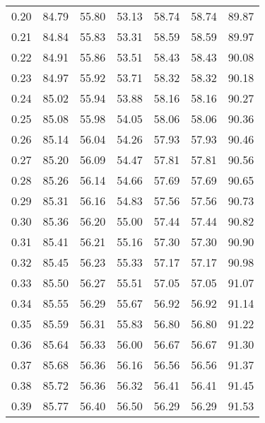 \begin{tabular}{|c|c|c|c|c|c|c|}
      0.20 &     84.79 &     55.80 &      53.13 &   58.74 &      58.74 &         89.87 \\
      0.21 &     84.84 &     55.83 &      53.31 &   58.59 &      58.59 &         89.97 \\
      0.22 &     84.91 &     55.86 &      53.51 &   58.43 &      58.43 &         90.08 \\
      0.23 &     84.97 &     55.92 &      53.71 &   58.32 &      58.32 &         90.18 \\
      0.24 &     85.02 &     55.94 &      53.88 &   58.16 &      58.16 &         90.27 \\
      0.25 &     85.08 &     55.98 &      54.05 &   58.06 &      58.06 &         90.36 \\
      0.26 &     85.14 &     56.04 &      54.26 &   57.93 &      57.93 &         90.46 \\
      0.27 &     85.20 &     56.09 &      54.47 &   57.81 &      57.81 &         90.56 \\
      0.28 &     85.26 &     56.14 &      54.66 &   57.69 &      57.69 &         90.65 \\
      0.29 &     85.31 &     56.16 &      54.83 &   57.56 &      57.56 &         90.73 \\
      0.30 &     85.36 &     56.20 &      55.00 &   57.44 &      57.44 &         90.82 \\
      0.31 &     85.41 &     56.21 &      55.16 &   57.30 &      57.30 &         90.90 \\
      0.32 &     85.45 &     56.23 &      55.33 &   57.17 &      57.17 &         90.98 \\
      0.33 &     85.50 &     56.27 &      55.51 &   57.05 &      57.05 &         91.07 \\
      0.34 &     85.55 &     56.29 &      55.67 &   56.92 &      56.92 &         91.14 \\
      0.35 &     85.59 &     56.31 &      55.83 &   56.80 &      56.80 &         91.22 \\
      0.36 &     85.64 &     56.33 &      56.00 &   56.67 &      56.67 &         91.30 \\
      0.37 &     85.68 &     56.36 &      56.16 &   56.56 &      56.56 &         91.37 \\
      0.38 &     85.72 &     56.36 &      56.32 &   56.41 &      56.41 &         91.45 \\
      0.39 &     85.77 &     56.40 &      56.50 &   56.29 &      56.29 &         91.53 \\

\end{tabular}
